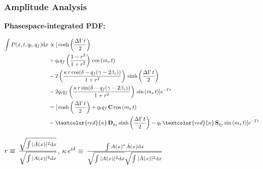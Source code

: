 \documentclass[]{beamer}
\begin{document}
\begin{frame}
	\frametitle{Amplitude Analysis}

	\centering
	\small
	\textbf{Phasespace-integrated PDF:}
	\scriptsize
	\begin{block}{}
\begin{align*}
	\int P(x,t,q_t,q_f) \text d x &\propto   [
	\, \text{cosh} \left( \frac{\Delta \Gamma \, t}{2}\right) \\
	 & + q_t q_f \left( \frac{1-r^2}{1+r^2} \right) \, \text{cos} \left( m_s \, t \right)  \\
	 & -2 \left( \frac{\kappa \, r \, \text{cos}(\delta - q_f(\gamma - 2 \beta_s))}{1+r^2}  \right) \, \text{sinh} \left( \frac{\Delta \Gamma \, t}{2}\right)  \\
	 & -2 q_t q_f \left( \frac{\kappa \, r \, \text{sin}(\delta - q_f(\gamma - 2 \beta_s))}{1+r^2}   \right)\, \text{sin} \left( m_s \, t \right)  ]  e^{- \Gamma t} \\
	 &=   [
	\, \text{cosh} \left( \frac{\Delta \Gamma \, t}{2}\right) 
	  + q_t q_f \, \textbf{C} \, \text{cos} \left( m_s \, t \right)   \\
	  & - \textcolor{red}{\kappa} \, \textbf{D}_{q_f} \, \text{sinh} \left( \frac{\Delta \Gamma \, t}{2}\right)  
	  - q_t \, \textcolor{red}{\kappa} \, \textbf{S}_{q_f}\, \text{sin} \left( m_s \, t \right)  ]  e^{- \Gamma t}
\end{align*}
	\end{block}
\vspace{0.2cm}
\small
$r \equiv \, \frac{\sqrt{\int \vert \bar A(x) \vert^2\text d x }}{\sqrt{\int \vert A(x) \vert^2\text d x}} $, 
$	\kappa \, e^{i\delta} \equiv \, \frac{\int A(x)^{*}  \bar A(x)  \text d x}{\sqrt{\int \vert A(x) \vert^2\text d x} \sqrt{\int \vert \bar A(x) \vert^2\text d x}  }$ %

\end{frame}
\end{document}
